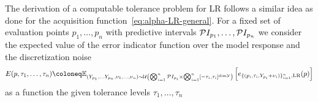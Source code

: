 The derivation of a computable tolerance problem for LR follows a similar idea as done for the acquisition function~\eqref{eq:alpha-LR-general}.
For a fixed set of evaluation points $p_1, \dots, p_n$ with predictive intervals $\mathcal PI_{p_1}, \dots, \mathcal PI_{p_n}$ we consider the expected value of the error indicator function over the model response and the discretization noise
\begin{equation} \label{eq:tol-exp-err}
    E(p, \tau_1, \dots, \tau_n)\coloneq \bb E _{ (Y_{p_1}, \dots Y_{p_n}, \nu_1, \dots, \nu_n) \sim  \mc U\left( \bigotimes_{i=1}^n \mc PI_{p_i} \times \bigotimes_{i=1}^n  [-\tau_i, \tau_i] ^{ \text{dim} \mc Y } \right)} 
    \left[ 
         e_{\{(p_i,\tau_i, Y_{p_i} + \nu_i )\}_{i=1}^n, \text{LR}}(p)
    \right]
\end{equation}
as a function the given tolerance levels $\tau_1, \dots, \tau_n$

